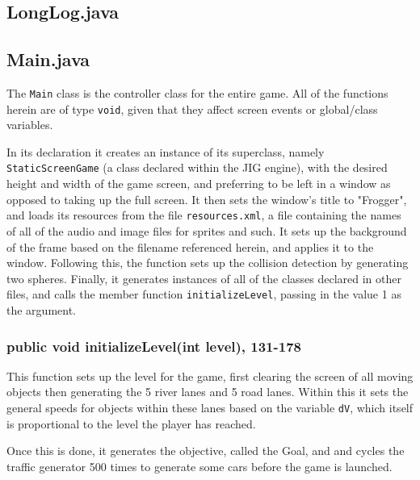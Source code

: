 \documentclass[12pt]{article}
\begin{document}
\subsection{LongLog.java}

\subsection{Main.java}
The \verb|Main| class is the controller class for the entire game.
All of the functions herein are of type \verb|void|, given that they affect screen events or global/class variables.

In its declaration it creates an instance of its superclass, namely \verb|StaticScreenGame| (a class declared within the JIG engine), with the desired height and width of the game screen, and preferring to be left in a window as opposed to taking up the full screen.
It then sets the window's title to "Frogger", and loads its resources from the file \verb|resources.xml|, a file containing the names of all of the audio and image files for sprites and such.
It sets up the background of the frame based on the filename referenced herein, and applies it to the window.
Following this, the function sets up the collision detection by generating two spheres.
Finally, it generates instances of all of the classes declared in other files, and calls the member function \verb|initializeLevel|, passing in the value 1 as the argument.

\subsubsection{public void initializeLevel(int level), 131-178}
This function sets up the level for the game, first clearing the screen of all moving objects then generating the 5 river lanes and 5 road lanes.
Within this it sets the general speeds for objects within these lanes based on the variable \verb|dV|, which itself is proportional to the level the player has reached.

Once this is done, it generates the objective, called the Goal, and and cycles the traffic generator 500 times to generate some cars before the game is launched.
\end{document}
